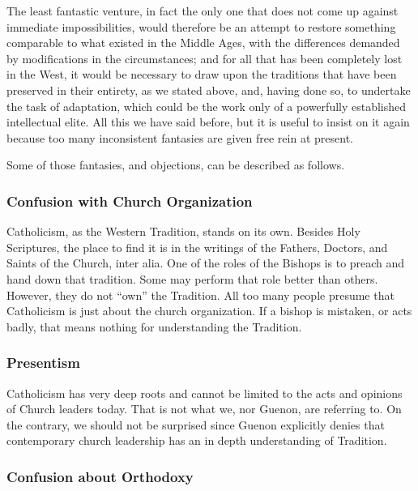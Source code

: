 \begin{quotex}
The least fantastic venture, in fact the only one that does not come up against immediate impossibilities, would therefore be an attempt to restore something comparable to what existed in the Middle Ages, with the differences demanded by modifications in the circumstances; and for all that has been completely lost in the West, it would be necessary to draw upon the traditions that have been preserved in their entirety, as we stated above, and, having done so, to undertake the task of adaptation, which could be the work only of a powerfully established intellectual elite. All this we have said before, but it is useful to insist on it again because too many inconsistent fantasies are given free rein at present.
\end{quotex}


Some of those fantasies, and objections, can be described as follows.

\subsubsection{Confusion with Church Organization}

Catholicism, as the Western Tradition, stands on its own. Besides Holy Scriptures, the place to find it is in the writings of the Fathers, Doctors, and Saints of the Church, inter alia. One of the roles of the Bishops is to preach and hand down that tradition. Some may perform that role better than others. However, they do not ``own'' the Tradition. All too many people presume that Catholicism is just about the church organization. If a bishop is mistaken, or acts badly, that means nothing for understanding the Tradition.

\subsubsection{Presentism}


Catholicism has very deep roots and cannot be limited to the acts and opinions of Church leaders today. That is not what we, nor Guenon, are referring to. On the contrary, we should not be surprised since Guenon explicitly denies that contemporary church leadership has an in depth understanding of Tradition.

\subsubsection{Confusion about Orthodoxy}

